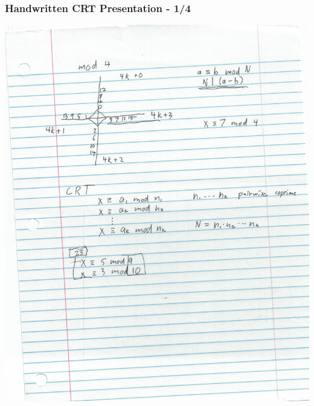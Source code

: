 \documentclass[aspectratio=169]{beamer}
\begin{document}
\begin{frame}[fragile]
\frametitle{Handwritten CRT Presentation - 1/4}
\includegraphics[height=0.8\paperheight]{jacques_page1.jpg}
\end{frame}
\end{document}
